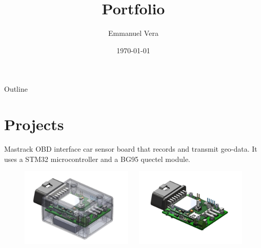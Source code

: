\documentclass[aspectratio=169]{beamer}
\title[Portfolio] {Portfolio}
\author{Emmanuel Vera}
\institute{Senior Electronics Engineer}
\date{\today}
\begin{document}
\maketitle

\begin{frame}{Outline}
  \tableofcontents
\end{frame}

\section{Projects}

\begin{frame}{Mastrack}
  OBD interface car sensor board that records and transmit geo-data. It uses a 
  STM32 microcontroller and a BG95 quectel module.
  \begin{figure}[H]
    \centering
    \begin{columns}[T]
      \begin{column}{.5\linewidth}
        \includegraphics[width=\linewidth]{images/Mastrack1}
      \end{column}
      \begin{column}{.5\linewidth}
        \includegraphics[width=\linewidth]{images/Mastrack2}
      \end{column}
    \end{columns}
  \end{figure}
\end{frame}
\end{document}
